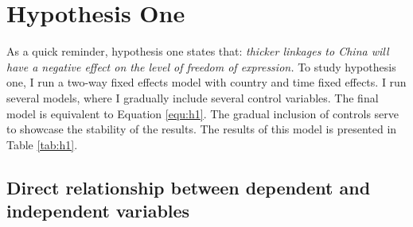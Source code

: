 \section{Hypothesis One} \label{sec:h1}
As a quick reminder, hypothesis one states that: \textit{thicker linkages to China will have a negative effect on the level of freedom of expression.} To study hypothesis one, I run a two-way fixed effects model with country and time fixed effects. I run several models, where I gradually include several control variables. The final model is equivalent to Equation \ref{equ:h1}. The gradual inclusion of controls serve to showcase the stability of the results. The results of this model is presented in Table \ref{tab:h1}. 

\subsection{Direct relationship between dependent and independent variables}
